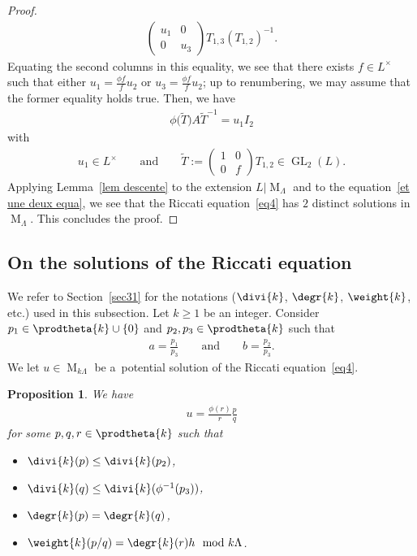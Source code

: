\documentclass[pdftex]{sigma}
\numberwithin{equation}{section}
\newtheorem{Proposition}[Theorem]{Proposition}
{ \theoremstyle{definition}
\newtheorem{Definition}[Theorem]{Definition}
\newtheorem{Remark}[Theorem]{Remark} }
\begin{document}
\begin{proof}
\begin{gather*}
\begin{pmatrix}
u_{1}&0
\\
0&u_{3}
\end{pmatrix}
T_{1,3} (T_{1,2} )^{-1}.
\end{gather*}
Equating the second columns in this equality, we see that there exists $f \in L^{\times}$ such that either
$u_{1}=\frac{\phi f}{f} u_{2}$ or $u_{3}=\frac{\phi f}{f} u_{2}$; up to renumbering, we may assume that the former
equality holds true.
Then, we have
\begin{gather}
\label{et une deux equa}
\phi\big(\widetilde{T}\big)A\widetilde{T}^{-1}= u_{1} I_{2}
\end{gather}
with
\begin{gather*}
u_{1} \in L^{\times} \qquad \text{and} \qquad \widetilde{T}:=
\begin{pmatrix}
1&0
\\
0&f
\end{pmatrix}
T_{1,2}\in \operatorname{GL}_{2}(L).
\end{gather*}
Applying Lemma~\ref{lem descente} to the extension $L \vert \operatorname{M}_{\Lambda}$ and to the equation~\eqref{et
une deux equa}, we see that the Riccati equation~\eqref{eq4} has $2$ distinct solutions in $\operatorname{M}_{\Lambda}$.
This concludes the proof.
\end{proof}

\subsection{On the solutions of the Riccati equation}

We refer to Section~\ref{sec31} for the notations ($\divi{k}$, $\degr{k}$, $\weight{k}$, etc.) used in this subsection.
Let $k\geq 1$ be an integer.
Consider $p_{1} \in \prodtheta{k} \cup \{0\}$ and $p_{2},p_{3} \in \prodtheta{k}$ such that
\begin{gather*}
a= \frac{p_{1}}{p_{3}} \qquad  \text{and} \qquad b = \frac{p_{2}}{p_{3}}.
\end{gather*}
We let $u \in \operatorname{M}_{k \Lambda}$ be a~potential solution of the Riccati equation~\eqref{eq4}.

\begin{Proposition}
\label{propo2}
We have
\begin{gather*}
u = \frac{\phi(r)}{r}\frac{p}{q}
\end{gather*}
for some $p,q, r\in \prodtheta{k}$ such that
\begin{itemize}
\itemsep=0pt
\item[$(i)$] $\divi{k} (p) \leq \divi{k} (p_{2})$,
\item[$(ii)$] $\divi{k} (q) \leq \divi{k} (\phi^{-1}(p_{3}))$,
\item[$(iii)$] $\degr{k} (p)=\degr{k} (q)$,
\item[$(iv)$] $\weight{k} (p/q)=\degr{k} (r) h \mod k\Lambda$.
\end{itemize}
\end{Proposition}
\end{document}
